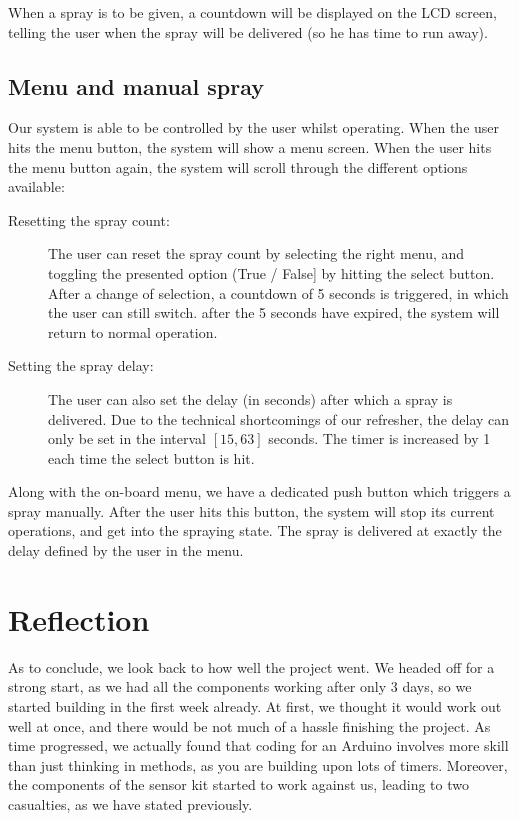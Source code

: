 \documentclass[a4paper, 12pt]{article}
\begin{document}
When a spray is to be given, a countdown will be displayed on the LCD screen, telling the user when the spray will be delivered (so he has time to run away).

\subsection{Menu and  manual spray}
Our system is able to be controlled by the user whilst operating. When the user hits the menu button, the system will show a menu screen. When the user hits the menu button again, the system will scroll through the different options available:

\begin{description}
\item[Resetting the spray count:] The user can reset the spray count by selecting the right menu, and toggling the presented option (True / False] by hitting the select button. After a change of selection, a countdown of 5 seconds is triggered, in which the user can still switch. after the 5 seconds have expired, the system will return to normal operation.
\item[Setting the spray delay:] The user can also set the delay (in seconds) after which a spray is delivered. Due to the technical shortcomings of our refresher, the delay can only be set in the interval $[15, 63]$ seconds. The timer is increased by 1 each time the select button is hit.
\end{description}

Along with the on-board menu, we have a dedicated push button which triggers a spray manually. After the user hits this button, the system will stop its current operations, and get into the spraying state. The spray is delivered at exactly the delay defined by the user in the menu.

\section{Reflection}

As to conclude, we look back to how well the project went. We headed off for a strong start, as we had all the components working after only 3 days, so we started building in the first week already. At first, we thought it would work out well at once, and there would be not much of a hassle finishing the project. As time progressed, we actually found that coding for an Arduino involves more skill than just thinking in methods, as you are building upon lots of timers. Moreover, the components of the sensor kit started to work against us, leading to two casualties, as we have stated previously.
\end{document}
